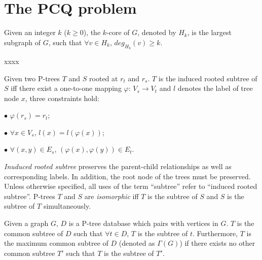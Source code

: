 \clearpage
\section{The PCQ problem}
\label{PCQproblem}




\begin{definition}
\label{def:kcore}
Given an integer $k$ ($k\geq 0$), the $k$-core of $G$,
denoted by $H_{k}$, is the largest subgraph of $G$, such that $\forall v \in H_k$, $deg_{H_k}(v) \geq k$.
\end{definition}

\begin{definition}
xxxx
\end{definition}

\begin{definition}
Given two P-trees $T$ and $S$ rooted at $r_t$ and $r_s$. $T$ is the induced rooted subtree of $S$ iff there exist a one-to-one mapping $\varphi$: $V_s \to V_t$ and $l$ denotes the label of tree node $x$, three constraints hold:

\vspace{1ex}

$\bullet$ $\varphi(r_s)=r_t$;

$\bullet$ $\forall x \in V_s$, $l(x)=l(\varphi(x))$;

$\bullet$ $\forall (x,y) \in E_s$, $(\varphi(x),\varphi(y)) \in E_t$. 
\end{definition}

{\it Inuduced rooted subtree} preserves the parent-child relationships as well as corresponding labels. In addition, the root node of the trees must be preserved. Unless otherwise specified, all uses of the term ``subtree'' refer to ``induced rooted subtree''. P-trees $T$ and $S$ are {\it isomorphic} iff $T$ is the subtree of $S$ and $S$ is the subtree of $T$ simultaneously.


\begin{definition}
Given a graph $G$, $D$ is a P-tree database which pairs with vertices in $G$. $T$ is the common subtree of $D$ such that $\forall t \in D$, $T$ is the subtree of $t$. Furthermore, $T$ is the maximum common subtree of $D$ (denoted as $\Gamma(G)$) if there exists no other common subtree $T'$ such that $T$ is the subtree of $T'$. 

\end{definition}



